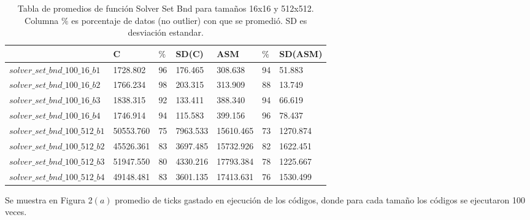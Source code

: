 \begin{table}[htbp]
\begin{center}
\begin{tabular}{|l|l|l|l|l|l|l|}
\hline
  & C & $\%$ &  SD(C)  & ASM & $\%$  & SD(ASM)\\
\hline \hline
$solver\_set\_bnd\_100\_16\_b1$ & 1728.802  & 96 &176.465  & 308.638  & 94 & 51.883 \\ \hline
$solver\_set\_bnd\_100\_16\_b2$  & 1766.234 & 98 & 203.315  &  313.909  & 88 & 13.749 \\ \hline
$solver\_set\_bnd\_100\_16\_b3$  & 1838.315  & 92 &133.411  & 388.340  & 94 & 66.619  \\ \hline
$solver\_set\_bnd\_100\_16\_b4$  & 1746.914  & 94 & 115.583  & 399.156  &  96 & 78.437 \\ 
\hline \hline
$solver\_set\_bnd\_100\_512\_b1$  & 50553.760  & 75 &7963.533   & 15610.465  & 73 &1270.874  \\ \hline

$solver\_set\_bnd\_100\_512\_b2$  & 45526.361  & 83 & 3697.485  & 15732.926  & 82 & 1622.451  \\ \hline

$solver\_set\_bnd\_100\_512\_b3$  &   51947.550  & 80 & 4330.216  & 17793.384  &78 & 1225.667 \\ \hline

$solver\_set\_bnd\_100\_512\_b4$  & 49148.481  & 83 & 3601.135   & 17413.631 & 76 & 1530.499 \\ \hline

\end{tabular}
\caption{Tabla de promedios de función Solver Set Bnd para tamaños 16x16 y 512x512. Columna $\%$ es porcentaje de datos (no outlier) con que se promedió. SD es desviación estandar.}
\end{center}
\end{table}

Se muestra en Figura 2$(a)$ promedio de ticks gastado en ejecución de los códigos, donde para cada tamaño los códigos se ejecutaron 100 veces.

  

